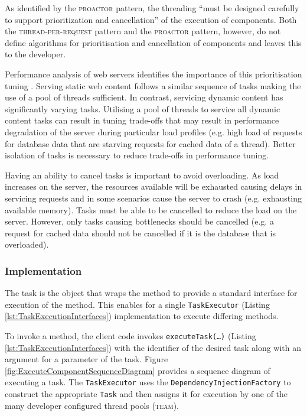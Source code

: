 \documentclass[prodmode]{style/acmlarge}
\begin{document}
As identified by the \textsc{proactor} pattern, the threading ``must be designed
carefully to support prioritization and cancellation'' \cite[p. 8]{proactor} of
the execution of components.  Both the \textsc{thread-per-request} pattern and
the \textsc{proactor} pattern, however, do not define algorithms for
prioritisation and cancellation of components and leaves this to the developer.

Performance analysis of web servers identifies the importance of this
prioritisation tuning
\cite{tuning-important,low-server-footprint,tuning-os-important}.
Serving static web content follows a similar sequence of tasks making the use of
a pool of threads sufficient.  In contrast, servicing dynamic content has
significantly varying tasks.  Utilising a pool of threads to service all dynamic
content tasks can result in tuning trade-offs that may result in performance
degradation of the server during particular load profiles (e.g. high load of
requests for database data that are starving requests for cached data of a
thread).  Better isolation of tasks is necessary to reduce trade-offs in
performance tuning.

Having an ability to cancel tasks is important to avoid overloading.  As
load increases on the server, the resources available will be exhausted causing
delays in servicing requests and in some scenarios cause the server to crash
(e.g. exhausting available memory).  Tasks must be able to be cancelled to
reduce the load on the server.  However, only tasks causing bottlenecks
should be cancelled (e.g. a request for cached data should not be cancelled if
it is the database that is overloaded).


\subsubsection*{Implementation}

The task is the object that wraps the method to provide a standard interface for
execution of the method.  This enables for a single \texttt{TaskExecutor}
(Listing \ref{lst:TaskExecutionInterfaces}) implementation to execute
differing methods.

To invoke a method, the client code invokes \texttt{executeTask(\ldots)}
(Listing \ref{lst:TaskExecutionInterfaces}) with the identifier of the desired
task along with an argument for a parameter of the task.  Figure
\ref{fig:ExecuteComponentSequenceDiagram} provides a sequence diagram of
executing a task.  The \texttt{TaskExecutor} uses the
\texttt{DependencyInjectionFactory} to construct the appropriate \texttt{Task}
and then assigns it for execution by one of the many developer configured thread
pools (\textsc{team}).
\end{document}
